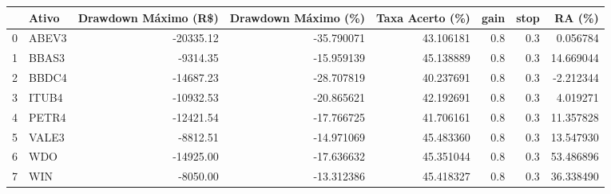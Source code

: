 \begin{tabular}{llrrrrrr}
\toprule
{} & Ativo &  Drawdown Máximo (R\$) &  Drawdown Máximo (\%)  &       Taxa Acerto (\%) &  gain &  stop &  RA (\%) \\
\midrule
0 &      ABEV3 &         -20335.12 &                   -35.790071 &  43.106181 &   0.8 &   0.3 &            0.056784 \\
1 &      BBAS3 &          -9314.35 &                   -15.959139 &  45.138889 &   0.8 &   0.3 &           14.669044 \\
2 &      BBDC4 &         -14687.23 &                   -28.707819 &  40.237691 &   0.8 &   0.3 &           -2.212344 \\
3 &      ITUB4 &         -10932.53 &                   -20.865621 &  42.192691 &   0.8 &   0.3 &            4.019271 \\
4 &      PETR4 &         -12421.54 &                   -17.766725 &  41.706161 &   0.8 &   0.3 &           11.357828 \\
5 &      VALE3 &          -8812.51 &                   -14.971069 &  45.483360 &   0.8 &   0.3 &           13.547930 \\
6 &        WDO &         -14925.00 &                   -17.636632 &  45.351044 &   0.8 &   0.3 &           53.486896 \\
7 &        WIN &          -8050.00 &                   -13.312386 &  45.418327 &   0.8 &   0.3 &           36.338490 \\
\bottomrule
\end{tabular}
